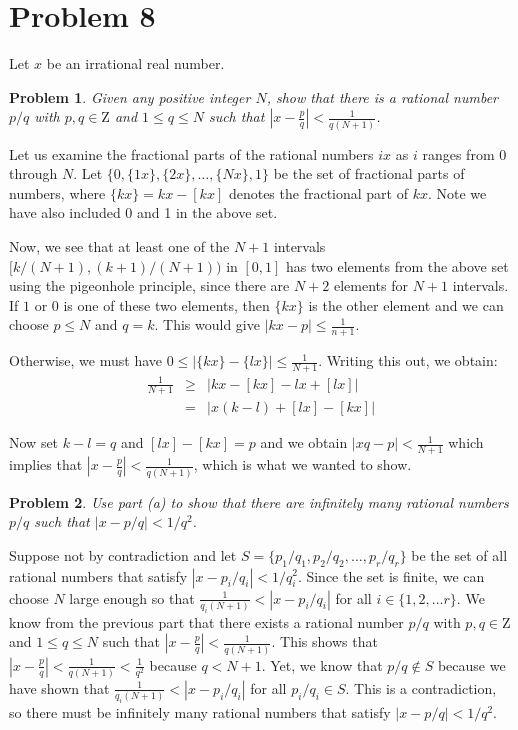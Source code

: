 \documentclass[psamsfonts]{amsart}
\newtheorem{prob}{Problem}[section]
\newenvironment{sol}{{\bfseries Solution}}{\qedsymbol}
\theoremstyle{definition}
\theoremstyle{remark}
\numberwithin{equation}{section}
\begin{document}
\section{Problem 8}

Let $x$ be an irrational real number.

\begin{prob}
Given any positive integer $N$, show that there is a rational number $p/q$ with $p,q \in \mathrm{Z}$ and $1 \leq q \leq N$ such that $|x - \frac{p}{q}| < \frac{1}{q (N+1)}$. 
\end{prob}

\begin{sol}
Let us examine the fractional parts of the rational numbers $ix$ as $i$ ranges from $0$ through $N$. Let $\{ 0, \{1x\}, \{2x\}, \ldots, \{Nx\}, 1\}$ be the set of fractional parts of numbers, where $\{kx\} = kx - [kx]$ denotes the fractional part of $kx$. Note we have also included 0 and 1 in the above set. 

Now, we see that at least one of the $N+1$ intervals $[k/(N+1), (k+1)/(N+1))$ in $[0,1]$ has two elements from the above set using the pigeonhole principle, since there are $N+2$ elements for $N+1$ intervals. If $1$ or $0$ is one of these two elements, then $\{kx\}$ is the other element and we can choose $p \leq N$ and $q = k$. This would give $|kx - p| \leq \frac{1}{n+1}$.

Otherwise, we must have $0 \leq | \{kx\} - \{lx\} | \leq \frac{1}{N+1}$. Writing this out, we obtain:
\begin{eqnarray}
\frac{1}{N+1} &\geq& | kx - [kx] - lx + [lx] | \\
&=& | x(k - l) + [lx] - [kx]  |
\end{eqnarray}

Now set $k-l = q$ and $[lx] - [kx] = p$ and we obtain $|xq - p| < \frac{1}{N+1}$ which implies that $|x - \frac{p}{q}| < \frac{1}{q(N+1)}$, which is what we wanted to show.
\end{sol}

\begin{prob}
Use part (a) to show that there are infinitely many rational numbers $p/q$ such that $|x - p/q| < 1/q^2$. 
\end{prob}

\begin{sol}
Suppose not by contradiction and let $S = \{ p_1/ q_1, p_2/q_2, \ldots, p_r/q_r \}$ be the set of all rational numbers that satisfy $|x - p_i/q_i | < 1 / q_i^2$. Since the set is finite, we can choose $N$ large enough so that $\frac{1}{q_i (N+1)} < | x - p_i/q_i |$ for all $i \in \{1, 2, \ldots r \}$. We know from the previous part that there exists a rational number $p/q$ with $p,q \in \mathrm{Z}$ and $1 \leq q \leq N$ such that $|x - \frac{p}{q}| < \frac{1}{q (N+1)}$. This shows that $|x - \frac{p}{q}| < \frac{1}{q(N+1)} < \frac{1}{q^2}$ because $q < N + 1$. Yet, we know that $p/q \not \in S$ because we have shown that $\frac{1}{q_i (N+1)} < |x - p_i / q_i|$ for all $p_i / q_i \in S$. This is a contradiction, so there must be infinitely many rational numbers that satisfy $|x - p/q| < 1/q^2$. 
\end{sol}
\end{document}
